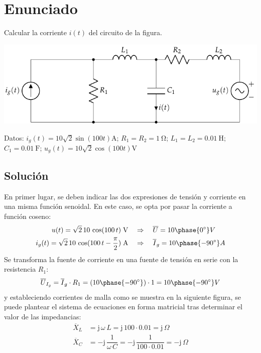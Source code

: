 \section{Enunciado}

Calcular la corriente $i(t)$ del circuito de la figura.

\begin{center}
  \includegraphics{figuras/BT2_13.pdf}
\end{center}
Datos: $i_g(t) = 10\sqrt{2}\sin(100t)\unit{\ampere}$; $R_1 = R_2 = \qty{1}{\ohm}$; $L_1 = L_2 = \qty{0.01}{\henry}$; $C_1 = \qty{0.01}{\farad}$; $u_g(t) = 10\sqrt{2}\cos(100t)\unit{\volt}$
\subsection*{Solución}

En primer lugar, se deben indicar las dos expresiones de tensión y
corriente en una misma función senoidal. En este caso, se opta por
pasar la corriente a función coseno:
\begin{align*}
  u(t)=\sqrt{2}\,10\,\cos(100\,t) \;\si{\volt}  &\quad\Rightarrow\quad \overline{U}=10\phase{\ang{0}} V\\
  i_g(t)=\sqrt{2}\,10\,\cos(100\,t-\frac{\pi}{2}) \;\si{\ampere} &\quad\Rightarrow\quad \overline{I}_g=10\phase{\ang{-90}} A
\end{align*}
Se transforma la fuente de corriente en una fuente de tensión en serie
con la resistencia $R_1$:
\begin{equation*}
  \overline{U}_{I_g}=\overline{I}_g \cdot R_{1}=(10\phase{\ang{-90}})\cdot 1=10\phase{\ang{-90}} V
\end{equation*}
y estableciendo corrientes de malla como se muestra en la siguiente
figura, se puede plantear el sistema de ecuaciones en forma matricial
tras determinar el valor de las impedancias:
\begin{align*}
  \overline{X}_L&=\mathrm{j}\,\omega\,L=\mathrm{j}\, 100\cdot 0.01= \mathrm{j}\,\Omega\\
  \overline{X}_C&=-\mathrm{j}\,\dfrac{1}{\omega\,C}=-\mathrm{j}\, \dfrac{1}{100\cdot 0.01}= -\mathrm{j}\,\Omega
\end{align*}

